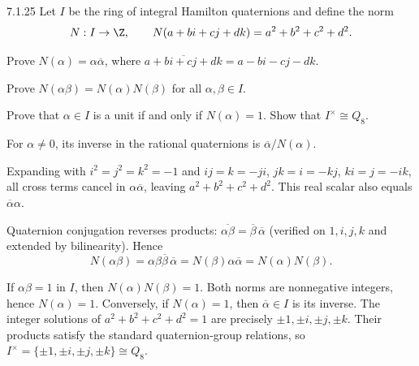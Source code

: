 \documentclass[11pt,oneside]{article}
\begin{document}
\begin{exercise}{7.1.25}
Let $I$ be the ring of integral Hamilton quaternions and define the norm
\[
N:I\to\Z,\qquad N(a+bi+cj+dk)=a^2+b^2+c^2+d^2.
\]
\begin{exercisesubparts}
\item Prove $N(\alpha)=\alpha\overline\alpha$, where $\overline{a+bi+cj+dk}=a-bi-cj-dk$.
\item Prove $N(\alpha\beta)=N(\alpha)N(\beta)$ for all $\alpha,\beta\in I$.
\item Prove that $\alpha\in I$ is a unit if and only if $N(\alpha)=1$. Show that $I^\times\cong Q_8$.
\end{exercisesubparts}
\begin{hint}
For $\alpha\ne0$, its inverse in the rational quaternions is $\overline\alpha/N(\alpha)$.
\end{hint}
\end{exercise}
\begin{solution}
\begin{exercisesubparts}
\item Expanding with $i^2=j^2=k^2=-1$ and $ij=k=-ji$, $jk=i=-kj$, $ki=j=-ik$, all cross terms cancel in $\alpha\overline\alpha$, leaving $a^2+b^2+c^2+d^2$. This real scalar also equals $\overline\alpha\alpha$.
\item Quaternion conjugation reverses products: $\overline{\alpha\beta}=\overline\beta\,\overline\alpha$ (verified on $1,i,j,k$ and extended by bilinearity). Hence
\[
N(\alpha\beta)=\alpha\beta\overline\beta\,\overline\alpha
=N(\beta)\alpha\overline\alpha=N(\alpha)N(\beta).
\]
\item If $\alpha\beta=1$ in $I$, then $N(\alpha)N(\beta)=1$. Both norms are nonnegative integers, hence $N(\alpha)=1$. Conversely, if $N(\alpha)=1$, then $\overline\alpha\in I$ is its inverse. The integer solutions of $a^2+b^2+c^2+d^2=1$ are precisely $\pm1,\pm i,\pm j,\pm k$. Their products satisfy the standard quaternion-group relations, so $I^\times=\{\pm1,\pm i,\pm j,\pm k\}\cong Q_8$.
\end{exercisesubparts}
\end{solution}
\end{document}
